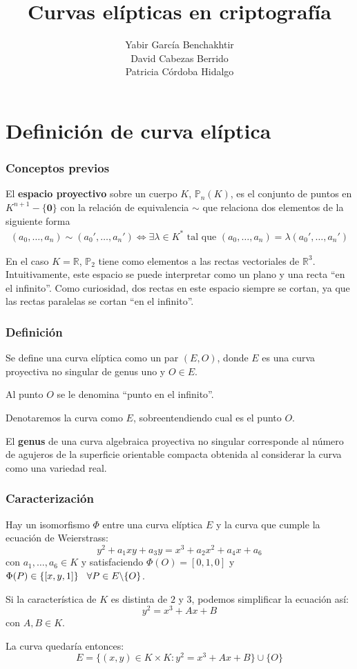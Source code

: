 \documentclass[xcolor=x11names,compress,utf8, 9pt]{beamer}
\begin{document}
\title{Curvas elípticas en criptografía}  
\author{Yabir García Benchakhtir\\
David Cabezas Berrido\\
Patricia Córdoba Hidalgo}
\date{}

\begin{frame}
\titlepage
\end{frame}

\section{Definición de curva elíptica}
\begin{frame}\frametitle{Conceptos previos}
El \textbf{espacio proyectivo} sobre un cuerpo $K$, $\mathbb{P}_n(K)$, es el conjunto de puntos en
$K^{n+1}-\{\mathbf{0}\}$ con la relación de equivalencia $\sim$ que
relaciona dos elementos de la siguiente forma
    \begin{align*} (a_0,\dots,a_n) \sim (a_0',\dots,a_n') \iff \exists
\lambda\in K^* \text{ tal que } (a_0,\dots,a_n) = \lambda
(a_0',\dots,a_n')
    \end{align*}

    En el caso $K=\mathbb{R}$, $\mathbb{P}_2$ tiene como elementos a
    las rectas vectoriales de $\mathbb{R}^3$. Intuitivamente, este
    espacio se puede interpretar como un plano y una recta ``en el
    infinito''. Como curiosidad, dos rectas en este espacio siempre se
    cortan, ya que las rectas paralelas se cortan ``en el infinito''.
\end{frame}

\begin{frame}\frametitle{Definición}
Se define una curva elíptica como un par $(E, O)$, donde $E$ es una
curva proyectiva no singular de genus uno y $O \in E$.

Al punto $O$ se le denomina ``punto en el infinito''.

Denotaremos la curva como $E$, sobreentendiendo cual es el punto $O$.

\vspace{5mm}

El \textbf{genus} de una curva algebraica proyectiva no singular corresponde
al número de agujeros de la superficie orientable compacta obtenida
al considerar la curva como una variedad real.

\end{frame}

\begin{frame}\frametitle{Caracterización}
Hay un isomorfismo $\Phi$ entre una curva elíptica $E$ y la curva que
cumple la ecuación de Weierstrass:
$$ y^2 + a_1xy + a_3y = x^3 + a_2x^2 + a_4x + a_6$$
con $a_1, \ldots, a_6 \in K$ y satisfaciendo $\Phi(O) = [0,1,0]$ y
$\Phi(P) \in \{[x,y,1]\} \hspace{3mm} \forall P \in E \backslash
\{O\}$.

Si la característica de $K$ es distinta de $2$ y $3$, podemos
simplificar la ecuación así:
$$y^2 = x^3 + Ax + B$$ con $A, B \in K$.

La curva quedaría entonces:
\[E=\{(x,y)\in K\times K:y^2=x^3+Ax+B\}\cup\{O\}\]

\end{frame}
\end{document}
